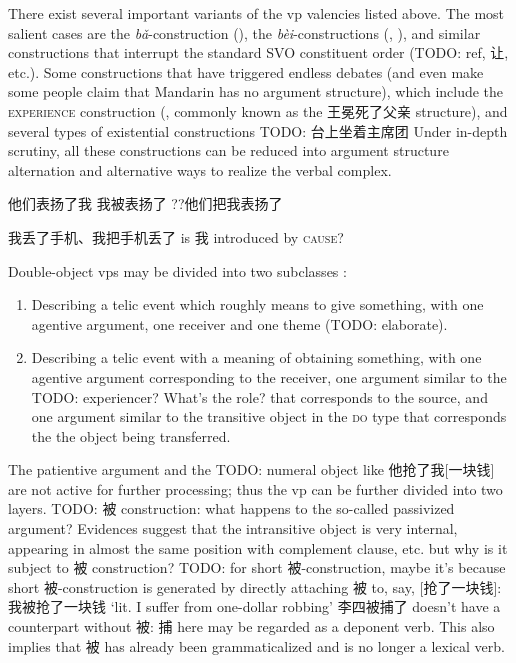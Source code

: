 \documentclass[UTF8, a4paper, oneside, scheme=plain]{ctexrep}
\newcommand*{\citesec}[1]{\S~{#1}}
\newcommand{\corpus}[1]{\emph{#1}}
\newcommand{\translate}[1]{`#1'}
\newcommand*{\category}[1]{\textsc{#1}}
\begin{document}
There exist several important variants of the \acs{vp} valencies listed above.
The most salient cases are the \corpus{bǎ}-construction (),
the \corpus{bèi}-constructions 
(, 
),
and similar constructions that interrupt the standard SVO constituent order (TODO: ref, 让, etc.).
Some constructions that have triggered endless debates 
(and even make some people claim that Mandarin has no argument structure),
which include the \category{experience} construction 
(, commonly known as the 王冕死了父亲 structure),
and several types of existential constructions TODO: 台上坐着主席团
Under in-depth scrutiny, 
all these constructions can be reduced into argument structure alternation 
and alternative ways to realize the verbal complex.

\begin{exe}
    \ex 他们表扬了我
    \ex 我被表扬了
    \ex ??他们把我表扬了
\end{exe}

我丢了手机、我把手机丢了 is 我 introduced by \category{cause}?

Double-object \acs{vp}s may be divided into 
two subclasses
\citep[\citesec{7.2}]{deng2010formal}:
\begin{enumerate}
    \item Describing a telic event which roughly means to give something, 
        with one agentive argument, 
        one receiver and one theme (TODO: elaborate).
    \item Describing a telic event with a meaning of obtaining something,
        with one agentive argument corresponding to the receiver, 
        one argument similar to the TODO: experiencer? What's the role? that corresponds to the source, 
        and one argument similar to the transitive object in the \category{do} type 
        that corresponds the the object being transferred.
\end{enumerate}

The patientive argument and the TODO: numeral object like 他抢了我[一块钱] 
are not active for further processing; 
thus the \acs{vp} can be further divided into two layers.
TODO: 被 construction: what happens to the so-called passivized argument?
Evidences suggest that the intransitive object is very internal, 
appearing in almost the same position with complement clause, etc.
but why is it subject to 被 construction? 
TODO: for short 被-construction, 
maybe it's because short 被-construction is generated by directly attaching 被 to, say, [抢了一块钱]: 
我被抢了一块钱 \translate{lit. I suffer from one-dollar robbing}
李四被捕了 doesn't have a counterpart without 被: 
捕 here may be regarded as a deponent verb. 
This also implies that 被 has already been grammaticalized 
and is no longer a lexical verb.
\end{document}
